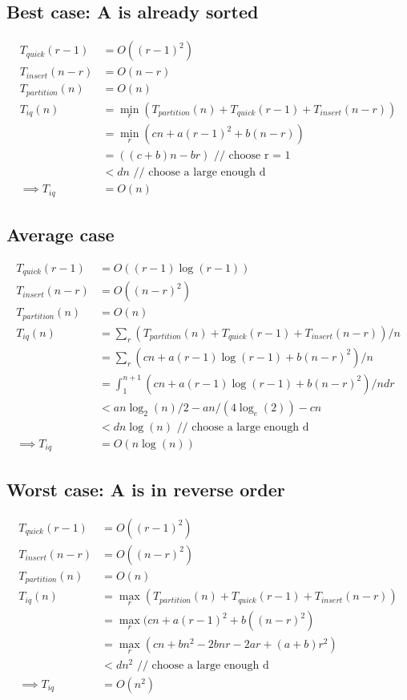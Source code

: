 \documentclass{article}
\begin{document}
\subsection{Best case: A is already sorted}
\begin{align*}
T_{quick}(r-1) &= O((r-1)^2)\\
T_{insert}(n-r) &= O(n-r)\\
T_{partition}(n) &= O(n)\\
T_{iq}(n)
&= \min_r (T_{partition}(n) + T_{quick}(r-1) + T_{insert}(n-r))\\
&= \min_r(cn + a(r-1)^2 + b(n-r))\\
&= ((c+b)n -br) \text{ // choose r = 1}\\
&< dn \text{ // choose a large enough d}\\
\implies T_{iq} &= O(n)
\end{align*}

\subsection{Average case}
\begin{align*}
T_{quick}(r-1) &= O((r-1) \log (r-1))\\
T_{insert}(n-r) &= O((n-r)^2)\\
T_{partition}(n) &= O(n)\\
T_{iq}(n)
&= \sum_r (T_{partition}(n) + T_{quick}(r-1) + T_{insert}(n-r))/n\\
&= \sum_r (cn + a (r-1) \log (r-1) + b(n-r)^2)/n\\
&= \int_1^{n+1} (cn + a (r-1) \log (r-1) + b(n-r)^2)/n d r\\
&< an \log_2(n)/2 - a n/(4\log_e(2)) - cn\\
&< dn \log(n) \text{ // choose a large enough d}\\
\implies T_{iq} &= O(n \log(n))
\end{align*}

\subsection{Worst case: A is in reverse order}
\begin{align*}
T_{quick}(r-1) &= O((r-1)^2)\\
T_{insert}(n-r) &= O((n-r)^2)\\
T_{partition}(n) &= O(n)\\
T_{iq}(n)
&= \max_r (T_{partition}(n) + T_{quick}(r-1) + T_{insert}(n-r))\\
&= \max_r(cn + a(r-1)^2 + b((n-r)^2)\\
&= \max_r (cn + bn^2 -2bnr -2ar + (a+b)r^2)\\
&< dn^2 \text{ // choose a large enough d}\\
\implies T_{iq} &= O(n^2)
\end{align*}
\end{document}

